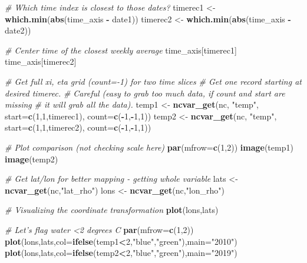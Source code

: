 \documentclass[
]{article}
\newenvironment{Shaded}{\begin{snugshade}}{\end{snugshade}}
\newcommand{\CommentTok}[1]{\textcolor[rgb]{0.56,0.35,0.01}{\textit{#1}}}
\newcommand{\DataTypeTok}[1]{\textcolor[rgb]{0.13,0.29,0.53}{#1}}
\newcommand{\DecValTok}[1]{\textcolor[rgb]{0.00,0.00,0.81}{#1}}
\newcommand{\KeywordTok}[1]{\textcolor[rgb]{0.13,0.29,0.53}{\textbf{#1}}}
\newcommand{\NormalTok}[1]{#1}
\newcommand{\OperatorTok}[1]{\textcolor[rgb]{0.81,0.36,0.00}{\textbf{#1}}}
\newcommand{\StringTok}[1]{\textcolor[rgb]{0.31,0.60,0.02}{#1}}
\begin{document}
\begin{Shaded}
\begin{Highlighting}[]
   \CommentTok{# Which time index is closest to those dates?}
\NormalTok{   timerec1 <-}\StringTok{ }\KeywordTok{which.min}\NormalTok{(}\KeywordTok{abs}\NormalTok{(time_axis }\OperatorTok{-}\StringTok{ }\NormalTok{date1))}
\NormalTok{   timerec2 <-}\StringTok{ }\KeywordTok{which.min}\NormalTok{(}\KeywordTok{abs}\NormalTok{(time_axis }\OperatorTok{-}\StringTok{ }\NormalTok{date2))}

   \CommentTok{# Center time of the closest weekly average}
\NormalTok{   time_axis[timerec1]}
\NormalTok{   time_axis[timerec2]}

   \CommentTok{# Get full xi, eta grid (count=-1) for two time slices}
   \CommentTok{# Get one record starting at desired timerec.  }
   \CommentTok{# Careful (easy to grab too much data, if count and start are missing}
   \CommentTok{# it will grab all the data).}
\NormalTok{   temp1 <-}\StringTok{ }\KeywordTok{ncvar_get}\NormalTok{(nc, }\StringTok{"temp"}\NormalTok{, }\DataTypeTok{start=}\KeywordTok{c}\NormalTok{(}\DecValTok{1}\NormalTok{,}\DecValTok{1}\NormalTok{,timerec1), }\DataTypeTok{count=}\KeywordTok{c}\NormalTok{(}\OperatorTok{-}\DecValTok{1}\NormalTok{,}\OperatorTok{-}\DecValTok{1}\NormalTok{,}\DecValTok{1}\NormalTok{))}
\NormalTok{   temp2 <-}\StringTok{ }\KeywordTok{ncvar_get}\NormalTok{(nc, }\StringTok{"temp"}\NormalTok{, }\DataTypeTok{start=}\KeywordTok{c}\NormalTok{(}\DecValTok{1}\NormalTok{,}\DecValTok{1}\NormalTok{,timerec2), }\DataTypeTok{count=}\KeywordTok{c}\NormalTok{(}\OperatorTok{-}\DecValTok{1}\NormalTok{,}\OperatorTok{-}\DecValTok{1}\NormalTok{,}\DecValTok{1}\NormalTok{))}

   \CommentTok{# Plot comparison (not checking scale here)}
   \KeywordTok{par}\NormalTok{(}\DataTypeTok{mfrow=}\KeywordTok{c}\NormalTok{(}\DecValTok{1}\NormalTok{,}\DecValTok{2}\NormalTok{))}
   \KeywordTok{image}\NormalTok{(temp1)}
   \KeywordTok{image}\NormalTok{(temp2)}

   \CommentTok{# Get lat/lon for better mapping - getting whole variable }
\NormalTok{   lats <-}\StringTok{ }\KeywordTok{ncvar_get}\NormalTok{(nc,}\StringTok{"lat_rho"}\NormalTok{)}
\NormalTok{   lons <-}\StringTok{ }\KeywordTok{ncvar_get}\NormalTok{(nc,}\StringTok{"lon_rho"}\NormalTok{)}

   \CommentTok{# Visualizing the coordinate transformation }
   \KeywordTok{plot}\NormalTok{(lons,lats)}

   \CommentTok{# Let's flag water <2 degrees C}
   \KeywordTok{par}\NormalTok{(}\DataTypeTok{mfrow=}\KeywordTok{c}\NormalTok{(}\DecValTok{1}\NormalTok{,}\DecValTok{2}\NormalTok{))}
   \KeywordTok{plot}\NormalTok{(lons,lats,}\DataTypeTok{col=}\KeywordTok{ifelse}\NormalTok{(temp1}\OperatorTok{<}\DecValTok{2}\NormalTok{,}\StringTok{"blue"}\NormalTok{,}\StringTok{"green"}\NormalTok{),}\DataTypeTok{main=}\StringTok{"2010"}\NormalTok{)}
   \KeywordTok{plot}\NormalTok{(lons,lats,}\DataTypeTok{col=}\KeywordTok{ifelse}\NormalTok{(temp2}\OperatorTok{<}\DecValTok{2}\NormalTok{,}\StringTok{"blue"}\NormalTok{,}\StringTok{"green"}\NormalTok{),}\DataTypeTok{main=}\StringTok{"2019"}\NormalTok{)}


\end{Highlighting}
\end{Shaded}
\end{document}
